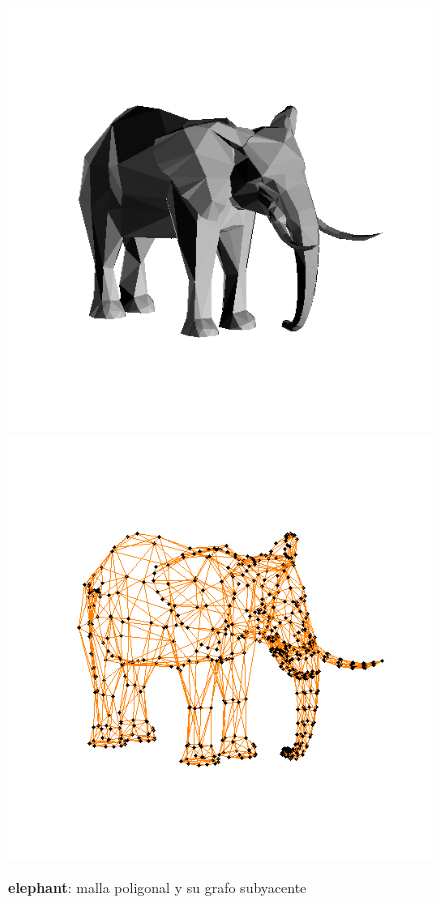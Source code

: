 \documentclass[conference,compsoc,a4paper]{IEEEtran}
\begin{document}
\begin{figure}
	\includegraphics[scale=.21]{elephav_solid.jpg} %
	\includegraphics[scale=.21]{elephav_graph.jpg} %
	\caption{\textbf{elephant}: malla poligonal y su grafo subyacente}%
	\label{fig:elephant} %
\end{figure}
\end{document}
